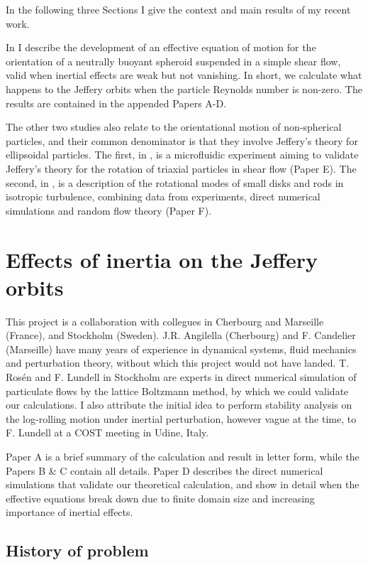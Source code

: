 \documentclass[thesis.tex]{subfiles}
\begin{document}
In the following three Sections I give the context and main results of my recent work. 

In  I describe the development of an effective equation of motion for the orientation of a neutrally buoyant spheroid suspended in a simple shear flow, valid when inertial effects are weak but not vanishing. In short, we calculate what happens to the Jeffery orbits when the particle Reynolds number is non-zero. The results are contained in the appended Papers A-D.

The other two studies also relate to the orientational motion of non-spherical particles, and their common denominator is that they involve Jeffery's theory for ellipsoidal particles.
The first, in , is a microfluidic experiment aiming to validate Jeffery's theory for the rotation of triaxial particles in shear flow (Paper E). The second, in , is a description of the rotational modes of small disks and rods in isotropic turbulence, combining data from experiments, direct numerical simulations and random flow theory (Paper F).

\chapter[Effects of inertia]{Effects of inertia on the Jeffery orbits}\label{sec:effective}

This project is a collaboration with collegues in Cherbourg and Marseille (France), and Stockholm (Sweden). J.R. Angilella (Cherbourg) and F. Candelier (Marseille) have many years of experience in dynamical systems, fluid mechanics and perturbation theory, without which this project would not have landed. T. Ros\'en and F. Lundell in Stockholm are experts in direct numerical simulation of particulate flows by the lattice Boltzmann method, by which we could validate our calculations. I also attribute the initial idea to perform stability analysis on the log-rolling motion under inertial perturbation, however vague at the time, to F. Lundell at a COST meeting in Udine, Italy. 

Paper A is a brief summary of the calculation and result in letter form, while the Papers B \& C contain all details. Paper D describes the direct numerical simulations that validate our theoretical calculation, and show in detail when the effective equations break down due to finite domain size and increasing importance of inertial effects.

\section{History of problem}
\end{document}
